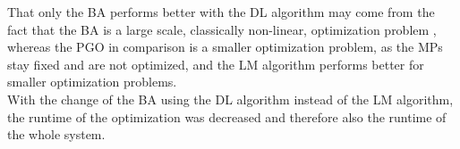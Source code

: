 That only the \ac{BA} performs better with the \ac{DL} algorithm may come from the fact that the \ac{BA} is a large scale, classically non-linear, optimization problem \cite{Lourakis2005, Triggs2000}, whereas the \ac{PGO} in comparison is a smaller optimization problem, as the \acp{MP} stay fixed and are not optimized, and the \ac{LM} algorithm performs better for smaller optimization problems.\\

With the change of the \ac{BA} using the \ac{DL} algorithm instead of the \ac{LM} algorithm, the runtime of the optimization was decreased and therefore also the runtime of the whole system.\\

